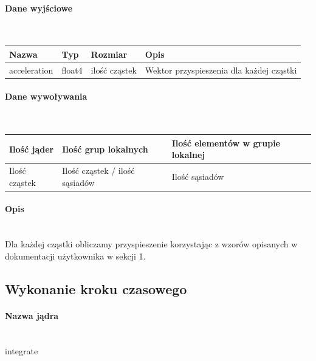 \documentclass[polish, 12pt]{aghthesis}
\begin{document}
				\paragraph{Dane wyjściowe} \ \\
					\begin{tabular}{| p{} | p{} | p{} | p{} |}
					\hline
						Nazwa & Typ & Rozmiar & Opis \\
					\hline
						acceleration & float4 & ilość cząstek & Wektor przyspieszenia dla każdej cząstki\\
					\hline
				\end{tabular}
				\paragraph{Dane wywoływania} \ \\
					\begin{tabular}{| p{} | p{} | p{}|}
					\hline
						Ilość jąder & Ilość grup lokalnych & Ilość elementów w grupie lokalnej \\
					\hline
						Ilość cząstek & Ilość cząstek / ilość sąsiadów & Ilość sąsiadów \\ 
					\hline
					\end{tabular}
				\paragraph{Opis} \ \\
					\indent Dla każdej cząstki obliczamy przyspieszenie korzystając z wzorów opisanych w dokumentacji użytkownika w sekcji 1.
		\subsection{Wykonanie kroku czasowego}
				\paragraph{Nazwa jądra} \ \\
					integrate
\end{document}
